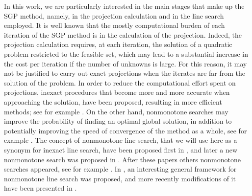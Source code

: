 In this work, we are particularly interested in the main stages that make up the SGP method, namely, in the projection calculation and in the line search employed.   It is well known that the mostly computational burden of each iteration of the SGP method is in the calculation of the projection.  Indeed, the   projection calculation requires, at each  iteration, the solution of a quadratic problem restricted to the feasible set,  which may lead to a substantial increase in the cost per iteration if the number of unknowns is large. For this reason, it may not be justified to carry out exact projections when the iterates are far from the solution of the problem. In order to reduce the computational effort spent on projections, inexact procedures that become more and more accurate when approaching the solution, have been proposed, resulting in more efficient methods;  see  for example   \cite{BirginMartinezRaydan2003, Bonettini2016,Golbabaee_Davies2018, Gonccalves2020, SalzoVilla2012, VillaSalzo2013, Rasch2020}.  On the other hand, nonmonotone searches may improve the probability of finding an optimal global solution, in addition to potentially improving the speed of convergence of the method as a whole, see for example \cite{Dai2002, Panier1991, Toint1996}. The concept of nonmonotone line search,  that we will use here as a synonym for  inexact line search,  have been proposed first in \cite{Grippo1986}, and  later a new nonmonotone search was proposed in \cite{ZhangHager2004}.  After these papers  others  nonmonotone searches appeared, see for example  \cite{Ahookhosh2012, MoLiuYan2007}.  In \cite{SachsSachs2011}, an interesting general framework for nonmonotone line search was proposed, and more recently modifications of it have been presented in \cite{GrapigliaSachs2017, GrapigliaSachs2020}.

